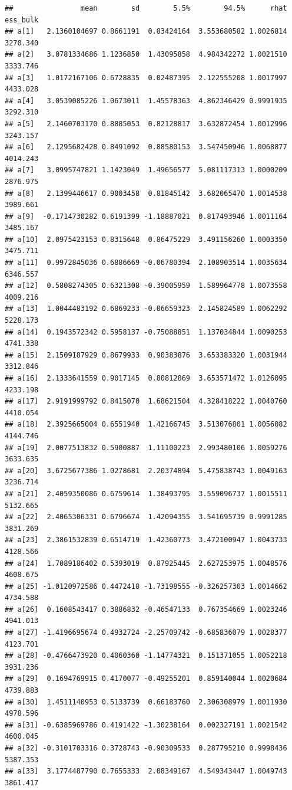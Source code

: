 \documentclass[
]{book}
\begin{document}
\begin{verbatim}
##                mean        sd        5.5%        94.5%      rhat ess_bulk
## a[1]   2.1360104697 0.8661191  0.83424164  3.553680582 1.0026814 3270.340
## a[2]   3.0781334686 1.1236850  1.43095858  4.984342272 1.0021510 3333.746
## a[3]   1.0172167106 0.6728835  0.02487395  2.122555208 1.0017997 4433.028
## a[4]   3.0539085226 1.0673011  1.45578363  4.862346429 0.9991935 3292.310
## a[5]   2.1460703170 0.8885053  0.82128817  3.632872454 1.0012996 3243.157
## a[6]   2.1295682428 0.8491092  0.88580153  3.547450946 1.0068877 4014.243
## a[7]   3.0995747821 1.1423049  1.49656577  5.081117313 1.0000209 2876.975
## a[8]   2.1399446617 0.9003458  0.81845142  3.682065470 1.0014538 3989.661
## a[9]  -0.1714730282 0.6191399 -1.18887021  0.817493946 1.0011164 3485.167
## a[10]  2.0975423153 0.8315648  0.86475229  3.491156260 1.0003350 3475.711
## a[11]  0.9972845036 0.6886669 -0.06780394  2.108903514 1.0035634 6346.557
## a[12]  0.5808274305 0.6321308 -0.39005959  1.589964778 1.0073558 4009.216
## a[13]  1.0044483192 0.6869233 -0.06659323  2.145824589 1.0062292 5228.173
## a[14]  0.1943572342 0.5958137 -0.75088851  1.137034844 1.0090253 4741.338
## a[15]  2.1509187929 0.8679933  0.90383876  3.653383320 1.0031944 3312.846
## a[16]  2.1333641559 0.9017145  0.80812869  3.653571472 1.0126095 4233.198
## a[17]  2.9191999792 0.8415070  1.68621504  4.328418222 1.0040760 4410.054
## a[18]  2.3925665004 0.6551940  1.42166745  3.513076801 1.0056082 4144.746
## a[19]  2.0077513832 0.5900887  1.11100223  2.993480106 1.0059276 3633.635
## a[20]  3.6725677386 1.0278681  2.20374894  5.475838743 1.0049163 3236.714
## a[21]  2.4059350086 0.6759614  1.38493795  3.559096737 1.0015511 5132.665
## a[22]  2.4065306331 0.6796674  1.42094355  3.541695739 0.9991285 3831.269
## a[23]  2.3861532839 0.6514719  1.42360773  3.472100947 1.0043733 4128.566
## a[24]  1.7089186402 0.5393019  0.87925445  2.627253975 1.0048576 4608.675
## a[25] -1.0120972586 0.4472418 -1.73198555 -0.326257303 1.0014662 4734.588
## a[26]  0.1608543417 0.3886832 -0.46547133  0.767354669 1.0023246 4941.013
## a[27] -1.4196695674 0.4932724 -2.25709742 -0.685836079 1.0028377 4123.701
## a[28] -0.4766473920 0.4060360 -1.14774321  0.151371055 1.0052218 3931.236
## a[29]  0.1694769915 0.4170077 -0.49255201  0.859140044 1.0020684 4739.883
## a[30]  1.4511140953 0.5133739  0.66183760  2.306308979 1.0011930 4978.596
## a[31] -0.6385969786 0.4191422 -1.30238164  0.002327191 1.0021542 4600.045
## a[32] -0.3101703316 0.3728743 -0.90309533  0.287795210 0.9998436 5387.353
## a[33]  3.1774487790 0.7655333  2.08349167  4.549343447 1.0049743 3861.417

\end{verbatim}
\end{document}
